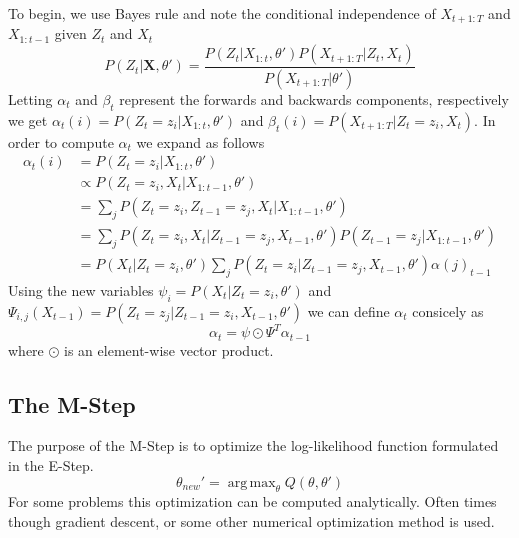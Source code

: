 \documentclass{amsart}
\theoremstyle{definition}
\theoremstyle{remark}
\numberwithin{equation}{section}
\DeclareMathOperator*{\argmax}{arg\,max}
\begin{document}
To begin, we use Bayes rule and note the conditional independence of $X_{t+1:T}$ and $X_{1:t-1}$ given $Z_t$ and $X_t$
\[
P(Z_t|\textbf{X},\theta') = \frac{P(Z_t|X_{1:t},\theta')P(X_{t+1:T}|Z_t,X_t)}{P(X_{t+1:T}|\theta')}
\]
Letting $\textbf{$\alpha$}_t$ and $\textbf{$\beta$}_t$ represent the forwards and backwards components, respectively we get $\alpha_t(i) = P(Z_t=z_i|X_{1:t},\theta')$ and $\beta_t(i) = P(X_{t+1:T}|Z_t=z_i,X_t)$. In order to compute $\alpha_t$ we expand as follows
\begin{align*}
\alpha_t(i) &= P(Z_t=z_i|X_{1:t}, \theta')\\
&\propto P(Z_t = z_i, X_t | X_{1:t-1}, \theta')\\
&= \sum_j P(Z_t = z_i, Z_{t-1} = z_j, X_t | X_{1:t-1},\theta')\\
&= \sum_j P(Z_t = z_i, X_t | Z_{t-1} = z_j, X_{t-1}, \theta')P(Z_{t-1} = z_j| X_{1:t-1}, \theta')\\
&= P(X_t | Z_t = z_i, \theta') \sum_j P(Z_t = z_i | Z_{t-1} = z_j, X_{t-1}, \theta')\alpha(j)_{t-1}
\end{align*}
Using the new variables $\psi_i = P(X_t | Z_t = z_i, \theta')$ and $\Psi_{i,j}(X_{t-1}) = P(Z_t = z_j | Z_{t-1} = z_i, X_{t-1}, \theta')$ we can define $\textbf{$\alpha$}_t$ consicely as
\[
\textbf{$\alpha$}_t = \textbf{$\psi$} \odot \textbf{$\Psi$}^T \textbf{$\alpha$}_{t-1}
\]
where $\odot$ is an element-wise vector product.


\subsection*{The M-Step}
The purpose of the M-Step is to optimize the log-likelihood function formulated in the E-Step.
\[
\theta_{new}' = \argmax_\theta Q(\theta,\theta')
\]
For some problems this optimization can be computed analytically. Often times though gradient descent, or some other numerical optimization method is used.
\end{document}

